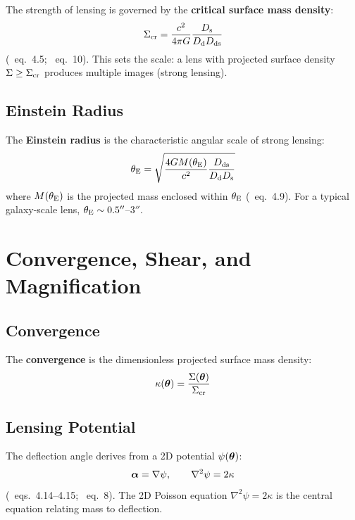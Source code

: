 \documentclass[11pt, letterpaper]{article}
\begin{document}
The strength of lensing is governed by the \textbf{critical surface
mass density}:
\begin{equation}
\Sigma_{\rm cr} = \frac{c^2}{4\pi G} \frac{D_{\rm s}}{D_{\rm d} D_{\rm ds}}
\label{eq:sigma-cr}
\end{equation}
(\CK\ eq.~4.5; \NB\ eq.~10). This sets the scale: a lens with
projected surface density $\Sigma \geq \Sigma_{\rm cr}$ produces multiple
images (strong lensing).

\subsection{Einstein Radius}

The \textbf{Einstein radius} is the characteristic angular scale of
strong lensing:
\begin{equation}
\theta_{\rm E} = \sqrt{\frac{4GM(\theta_{\rm E})}{c^2} \frac{D_{\rm ds}}{D_{\rm d} D_{\rm s}}}
\label{eq:einstein-radius}
\end{equation}
where $M(\theta_{\rm E})$ is the projected mass enclosed within $\theta_{\rm E}$
(\CK\ eq.~4.9). For a typical galaxy-scale lens,
$\theta_{\rm E} \sim 0.5''$--$3''$.

\section{Convergence, Shear, and Magnification}
\label{sec:convergence-shear}

\subsection{Convergence}

The \textbf{convergence} is the dimensionless projected surface mass density:
\begin{equation}
\kappa(\bm{\theta}) = \frac{\Sigma(\bm{\theta})}{\Sigma_{\rm cr}}
\label{eq:convergence}
\end{equation}

\subsection{Lensing Potential}

The deflection angle derives from a 2D potential $\psi(\bm{\theta})$:
\begin{equation}
\bm{\alpha} = \nabla \psi, \qquad \nabla^2 \psi = 2\kappa
\label{eq:lensing-potential}
\end{equation}
(\CK\ eqs.~4.14--4.15; \NB\ eq.~8). The 2D Poisson equation
$\nabla^2 \psi = 2\kappa$ is the central equation relating mass to
deflection.
\end{document}
